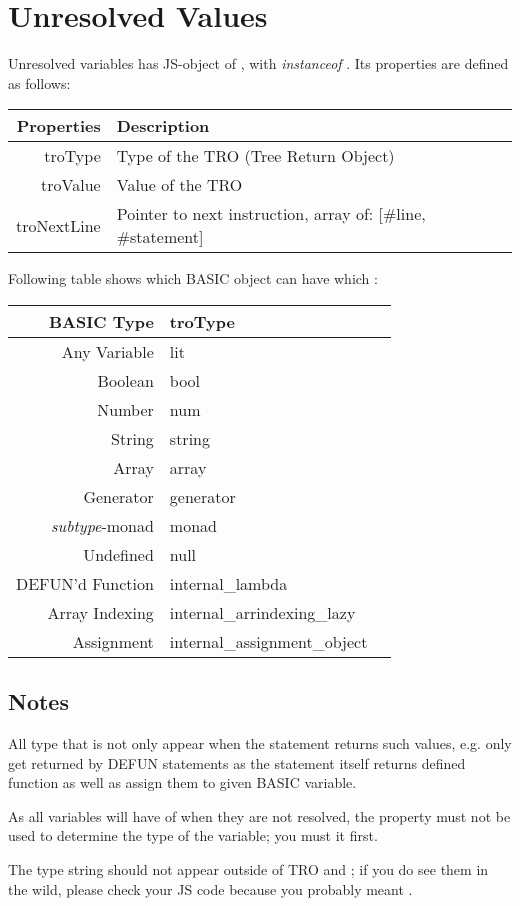\section{Unresolved Values}

Unresolved variables has JS-object of , with \emph{instanceof} . Its properties are defined as follows:

\begin{tabulary}{\textwidth}{RL}
Properties & Description \\
\hline
{\ttfamily troType} & Type of the TRO (Tree Return Object) \\
{\ttfamily troValue} & Value of the TRO \\
{\ttfamily troNextLine} & Pointer to next instruction, array of: [\#line, \#statement] \\
\end{tabulary}

Following table shows which BASIC object can have which :

\begin{tabulary}{\textwidth}{RLL}
BASIC Type & troType \\
\hline
Any Variable & {\ttfamily lit} \\
Boolean & {\ttfamily bool} \\
Number & {\ttfamily num} \\
String & {\ttfamily string} \\
Array & {\ttfamily array} \\
Generator & {\ttfamily generator} \\
\emph{subtype}-monad & {\ttfamily monad} \\
Undefined & {\ttfamily null} \\
DEFUN'd Function & {\ttfamily internal\_lambda} \\
Array Indexing & {\ttfamily internal\_arrindexing\_lazy} \\
Assignment & {\ttfamily internal\_assignment\_object} \\
\end{tabulary}

\subsection*{Notes}
\begin{itemlist}
\item All type that is not  only appear when the statement returns such values, e.g.  only get returned by DEFUN statements as the statement itself returns defined function as well as assign them to given BASIC variable.
\item As all variables will have  of  when they are not resolved, the property must not be used to determine the type of the variable; you must  it first.
\item The type string  should not appear outside of TRO and ; if you do see them in the wild, please check your JS code because you probably meant .
\end{itemlist}

